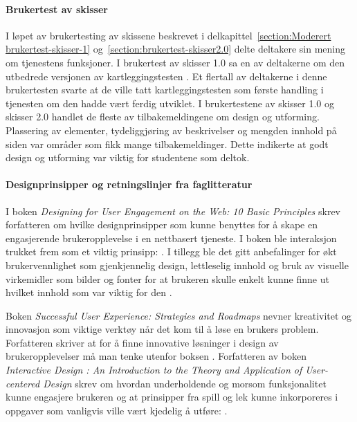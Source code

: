 \paragraph{Brukertest av skisser}
I løpet av brukertesting av skissene beskrevet i delkapittel~\ref{section:Moderert brukertest-skisser-1} og~\ref{section:brukertest-skisser2.0} delte deltakere sin mening om tjenestens funksjoner. I brukertest av skisser 1.0 sa en av deltakerne om den utbedrede versjonen av kartleggingstesten . Et flertall av deltakerne i denne brukertesten svarte at de ville tatt kartleggingstesten som første handling i tjenesten om den hadde vært ferdig utviklet. I brukertestene av skisser 1.0 og skisser 2.0 handlet de fleste av tilbakemeldingene om design og utforming. Plassering av elementer, tydeliggjøring av beskrivelser og mengden innhold på siden var områder som fikk mange tilbakemeldinger. Dette indikerte at godt design og utforming var viktig for studentene som deltok.

\paragraph{Designprinsipper og retningslinjer fra faglitteratur}
I boken {\em Designing for User Engagement on the Web: 10 Basic Principles} skrev forfatteren om hvilke designprinsipper som kunne benyttes for å skape en engasjerende brukeropplevelse i en nettbasert tjeneste. I boken ble interaksjon trukket frem som et viktig prinsipp:  \cite[71]{ENGAGEMENT-WEB:17}. I tillegg ble det gitt anbefalinger for økt brukervennlighet som gjenkjennelig design, lettleselig innhold og bruk av visuelle virkemidler som bilder og fonter for at brukeren skulle enkelt kunne finne ut hvilket innhold som var viktig for den \cite[31]{ENGAGEMENT-WEB:17}. 

Boken {\em Successful User Experience: Strategies and Roadmaps} nevner kreativitet og innovasjon som viktige verktøy når det kom til å løse en brukers problem. Forfatteren skriver at for å finne innovative løsninger i design av brukeropplevelser må man tenke utenfor boksen \cite[29]{SUCCESSFUL-UX:18}. Forfatteren av boken {\em Interactive Design : An Introduction to the Theory and Application of User-centered Design} skrev om hvordan underholdende og morsom funksjonalitet kunne engasjere brukeren og at prinsipper fra spill og lek kunne inkorporeres i oppgaver som vanligvis ville vært kjedelig å utføre:  \cite[123]{INTERACTIVE-DESIGN:19}.


